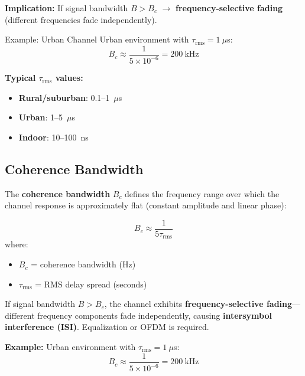 \textbf{Implication:} If signal bandwidth $B > B_c$ $\rightarrow$ \textbf{frequency-selective fading} (different frequencies fade independently).

\begin{calloutbox}{Example: Urban Channel}
Urban environment with $\tau_{\text{rms}} = 1~\mu$s:
\begin{equation*}
B_c \approx \frac{1}{5 \times 10^{-6}} = 200~\text{kHz}
\end{equation*}

\textbf{Typical $\tau_{\text{rms}}$ values:}
\begin{itemize}
\item \textbf{Rural/suburban}: 0.1--1~$\mu$s
\item \textbf{Urban}: 1--5~$\mu$s
\item \textbf{Indoor}: 10--100~ns
\end{itemize}
\end{calloutbox}

\subsection{Coherence Bandwidth}

The \textbf{coherence bandwidth} $B_c$ defines the frequency range over which the channel response is approximately flat (constant amplitude and linear phase):

\begin{equation}
B_c \approx \frac{1}{5\tau_{\text{rms}}}
\end{equation}
where:
\begin{itemize}
\item $B_c$ = coherence bandwidth (Hz)
\item $\tau_{\text{rms}}$ = RMS delay spread (seconds)
\end{itemize}

\begin{warningbox}
If signal bandwidth $B > B_c$, the channel exhibits \textbf{frequency-selective fading}---different frequency components fade independently, causing \textbf{intersymbol interference (ISI)}. Equalization or OFDM is required.
\end{warningbox}

\textbf{Example:} Urban environment with $\tau_{\text{rms}} = 1~\mu$s:
\begin{equation}
B_c \approx \frac{1}{5 \times 10^{-6}} = 200~\text{kHz}
\end{equation}

